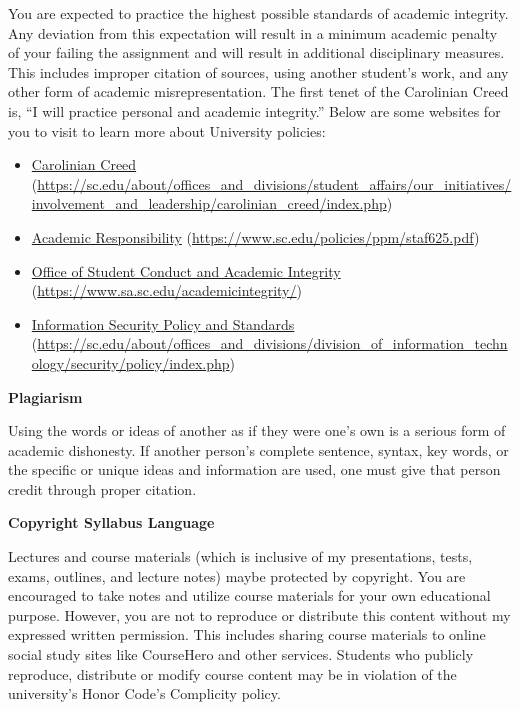 \documentclass[11pt,letterpaper]{article}
\begin{document}
You are expected to practice the highest possible standards of academic integrity. Any deviation from this expectation will result in a minimum academic penalty of your failing the assignment and will result in additional disciplinary measures. This includes improper citation of sources, using another student's work, and any other form of academic misrepresentation. The first tenet of the Carolinian Creed is, ``I will practice personal and academic integrity.'' Below are some websites for you to visit to learn more about University policies:
	\begin{itemize}
	\item \href{https://sc.edu/about/offices\_and\_divisions/student\_affairs/our\_initiatives/involvement\_and\_leadership/carolinian\_creed/index.php}{Carolinian Creed} (\url{https://sc.edu/about/offices\_and\_divisions/student\_affairs/our\_initiatives/involvement\_and\_leadership/carolinian\_creed/index.php})
	\item \href{https://www.sc.edu/policies/ppm/staf625.pdf}{Academic Responsibility} (\url{https://www.sc.edu/policies/ppm/staf625.pdf})
	\item \href{https://www.sa.sc.edu/academicintegrity/}{Office of Student Conduct and Academic Integrity} (\url{https://www.sa.sc.edu/academicintegrity/})
	\item \href{https://sc.edu/about/offices\_and\_divisions/division\_of\_information\_technology/security/policy/index.php}{Information Security Policy and Standards} (\url{https://sc.edu/about/offices\_and\_divisions/division\_of\_information\_technology/security/policy/index.php})
	\end{itemize} \pvspace{0.1cm}





\newpage





{\bfseries Plagiarism} \par
Using the words or ideas of another as if they were one's own is a serious form of academic dishonesty. If another person’s complete sentence, syntax, key words, or the specific or unique ideas and information are used, one must give that person credit through proper citation. \par\vspace{0.3cm}

{\bfseries Copyright Syllabus Language} \par
Lectures and course materials (which is inclusive of my presentations, tests, exams, outlines, and lecture notes) maybe protected by copyright. You are encouraged to take notes and utilize course materials for your own educational purpose. However, you are not to reproduce or distribute this content without my expressed written permission. This includes sharing course materials to online social study sites like CourseHero and other services. Students who publicly reproduce, distribute or modify course content may be in violation of the university's Honor Code’s Complicity policy. \par\vspace{0.3cm}
\end{document}
